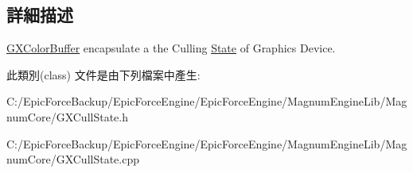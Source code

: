 \subsection{詳細描述}
\hyperlink{class_magnum_1_1_g_x_color_buffer}{G\+X\+Color\+Buffer} encapsulate a the Culling \hyperlink{class_magnum_1_1_state}{State} of Graphics Device. 

此類別(class) 文件是由下列檔案中產生\+:\begin{DoxyCompactItemize}
\item 
C\+:/\+Epic\+Force\+Backup/\+Epic\+Force\+Engine/\+Epic\+Force\+Engine/\+Magnum\+Engine\+Lib/\+Magnum\+Core/G\+X\+Cull\+State.\+h\item 
C\+:/\+Epic\+Force\+Backup/\+Epic\+Force\+Engine/\+Epic\+Force\+Engine/\+Magnum\+Engine\+Lib/\+Magnum\+Core/G\+X\+Cull\+State.\+cpp\end{DoxyCompactItemize}
